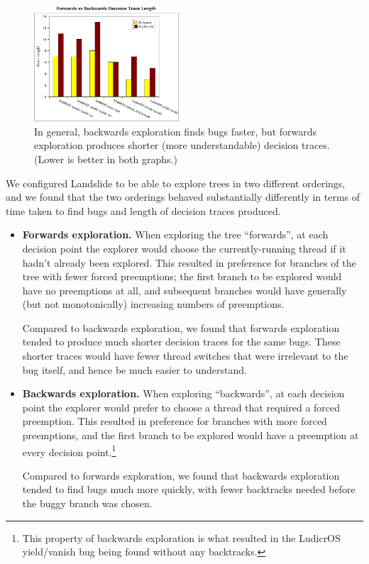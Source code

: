 {\begin{figure}[h]
	\hspace{0.01\textwidth}
	\includegraphics[width=0.48\textwidth]{graphs/backwards-trace.pdf}
	\caption{In general, backwards exploration finds bugs faster, but forwards exploration produces shorter (more understandable) decision traces. (Lower is better in both graphs.)}
	\label{fig:backwards-graphs}
\end{figure}
}

We configured Landslide to be able to explore trees in two different orderings, and we found that the two orderings behaved substantially differently in terms of time taken to find bugs and length of decision traces produced.

\begin{itemize}
	\item {\bf Forwards exploration.} When exploring the tree ``forwards'', at each decision point the explorer would choose the currently-running thread if it hadn't already been explored. This resulted in preference for branches of the tree with fewer forced preemptions; the first branch to be explored would have no preemptions at all, and subsequent branches would have generally (but not monotonically) increasing numbers of preemptions.

		Compared to backwards exploration, we found that forwards exploration tended to produce much shorter decision traces for the same bugs. These shorter traces would have fewer thread switches that were irrelevant to the bug itself, and hence be much easier to understand.
	\item {\bf Backwards exploration.} When exploring ``backwards'', at each decision point the explorer would prefer to choose a thread that required a forced preemption. This resulted in preference for branches with more forced preemptions, and the first branch to be explored would have a preemption at every decision point.\footnote{
		This property of backwards exploration is what resulted in the LudicrOS yield/vanish bug being found without any backtracks.}

		Compared to forwards exploration, we found that backwards exploration tended to find bugs much more quickly, with fewer backtracks needed before the buggy branch was chosen.
\end{itemize}

